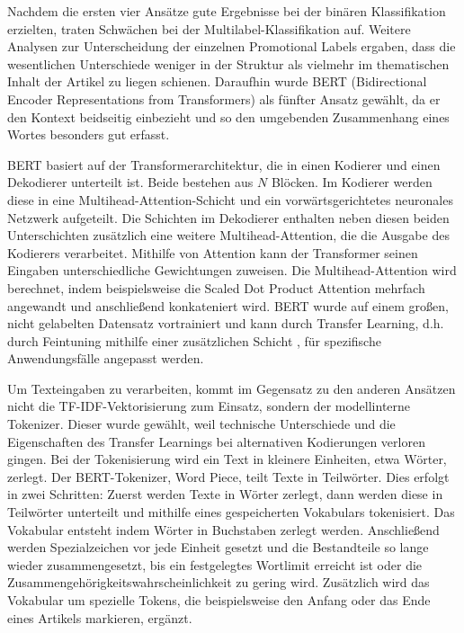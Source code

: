 Nachdem die ersten vier Ansätze gute Ergebnisse bei der binären Klassifikation erzielten, traten Schwächen bei der Multilabel-Klassifikation auf. Weitere Analysen zur Unterscheidung der einzelnen Promotional Labels ergaben, dass die wesentlichen Unterschiede weniger in der Struktur als vielmehr im thematischen Inhalt der Artikel zu liegen schienen. Daraufhin wurde BERT (Bidirectional Encoder Representations from Transformers) als fünfter Ansatz gewählt, da er den Kontext beidseitig einbezieht und so den umgebenden Zusammenhang eines Wortes besonders gut erfasst.

BERT basiert auf der Transformerarchitektur, die in einen Kodierer und einen Dekodierer unterteilt ist. Beide bestehen aus $N$ Blöcken. Im Kodierer werden diese in eine Multihead-Attention-Schicht und ein vorwärtsgerichtetes neuronales Netzwerk aufgeteilt. Die Schichten im Dekodierer enthalten neben diesen beiden Unterschichten zusätzlich eine weitere Multihead-Attention, die die Ausgabe des Kodierers verarbeitet. Mithilfe von Attention kann der Transformer seinen Eingaben unterschiedliche Gewichtungen zuweisen. Die Multihead-Attention wird berechnet, indem beispielsweise die Scaled Dot Product Attention \cite{Vaswani2017} mehrfach angewandt und anschließend konkateniert wird. BERT wurde auf einem großen, nicht gelabelten Datensatz vortrainiert und kann durch Transfer Learning, d.h. durch Feintuning mithilfe einer zusätzlichen Schicht \cite{Devlin2018}, für spezifische Anwendungsfälle angepasst werden.

Um Texteingaben zu verarbeiten, kommt im Gegensatz zu den anderen Ansätzen nicht die TF-IDF-Vektorisierung zum Einsatz, sondern der modellinterne Tokenizer. Dieser wurde gewählt, weil technische Unterschiede und die Eigenschaften des Transfer Learnings bei alternativen Kodierungen verloren gingen. Bei der Tokenisierung wird ein Text in kleinere Einheiten, etwa Wörter, zerlegt. Der BERT-Tokenizer, Word Piece, teilt Texte in Teilwörter. Dies erfolgt in zwei Schritten: Zuerst werden Texte in Wörter zerlegt, dann werden diese in Teilwörter unterteilt und mithilfe eines gespeicherten Vokabulars tokenisiert. Das Vokabular entsteht indem Wörter in Buchstaben zerlegt werden. Anschließend werden Spezialzeichen vor jede Einheit gesetzt und die Bestandteile so lange wieder zusammengesetzt, bis ein festgelegtes Wortlimit erreicht ist oder die Zusammengehörigkeitswahrscheinlichkeit zu gering wird. Zusätzlich wird das Vokabular um spezielle Tokens, die beispielsweise den Anfang oder das Ende eines Artikels markieren, ergänzt.

